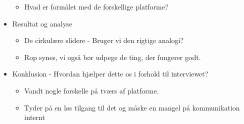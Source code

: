 \begin{itemize}
\begin{itemize}
		\item Hvad er formålet med de forskellige platforme?
	\end{itemize}
	\item Resultat og analyse
	\begin{itemize}
		\item De cirkulære slidere - Bruger vi den rigtige analogi?
		\item Rop synes, vi også bør udpege de ting, der fungerer godt.
	\end{itemize}
	\item Konklusion - Hvordan hjælper dette os i forhold til interviewet?
	\begin{itemize}
		\item Vandt nogle forskelle på tværs af platforme.
		\item Tyder på en løs tilgang til det og måske en mangel på kommunikation internt
	\end{itemize}
\end{itemize}

